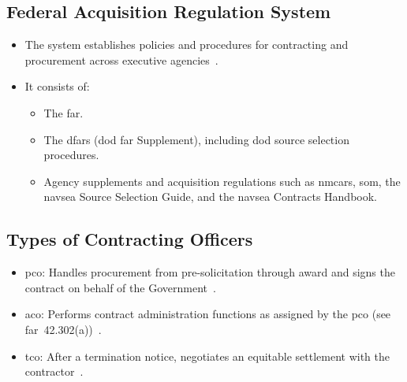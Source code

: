 \documentclass[../main.tex]{subfiles}
\begin{document}
\subsection{Federal Acquisition Regulation System}
\begin{itemize}
  \item The system establishes policies and procedures for contracting and procurement across executive agencies~\autocite{edo-3-2-1-intro-contracting-2025}.
  \item It consists of:
  \begin{itemize}
    \item The \ac{far}.
    \item The \ac{dfars} (\ac{dod} \ac{far} Supplement), including \ac{dod} source selection procedures.
    \item Agency supplements and acquisition regulations such as \ac{nmcars}, \ac{som}, the \ac{navsea} Source Selection Guide, and the \ac{navsea} Contracts Handbook.
  \end{itemize}
\end{itemize}

\subsection{Types of Contracting Officers}
\begin{itemize}
  \item \ac{pco}: Handles procurement from pre-solicitation through award and signs the contract on behalf of the Government~\autocite{edo-3-2-1-intro-contracting-2025}.
  \item \ac{aco}: Performs contract administration functions as assigned by the \ac{pco} (see \ac{far}~42.302(a))~\autocite{edo-3-2-1-intro-contracting-2025}.
  \item \ac{tco}: After a termination notice, negotiates an equitable settlement with the contractor~\autocite{edo-3-2-1-intro-contracting-2025}.
\end{itemize}
\end{document}
